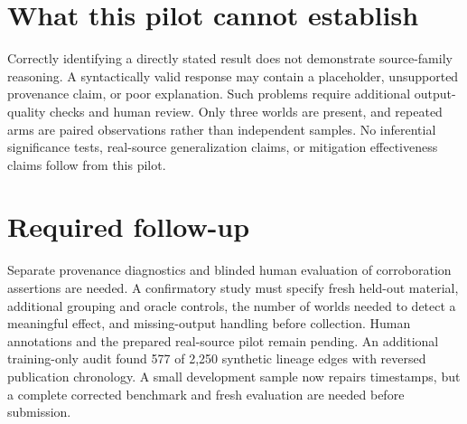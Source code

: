 \documentclass[11pt]{article}
\begin{document}
\section{What this pilot cannot establish}
Correctly identifying a directly stated result does not demonstrate source-family reasoning.
A syntactically valid response may contain a placeholder, unsupported provenance claim, or
poor explanation. Such problems require additional output-quality checks and human review.
Only three worlds are present, and repeated arms are paired observations rather than independent
samples. No inferential significance tests, real-source generalization claims, or mitigation
effectiveness claims follow from this pilot.

\section{Required follow-up}
Separate provenance diagnostics and blinded human evaluation of corroboration assertions are
needed. A confirmatory study must specify fresh held-out material, additional grouping and
oracle controls, the number of worlds needed to detect a meaningful effect, and missing-output
handling before collection. Human annotations and the prepared real-source pilot remain pending.
An additional training-only audit found 577 of 2,250 synthetic lineage edges with reversed
publication chronology. A small development sample now repairs timestamps, but a complete
corrected benchmark and fresh evaluation are needed before submission.
\end{document}

